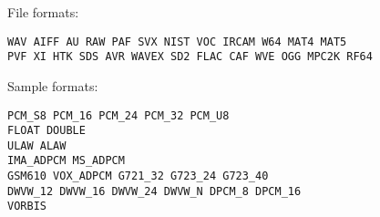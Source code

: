 File formats:
\begin{verbatim}
WAV AIFF AU RAW PAF SVX NIST VOC IRCAM W64 MAT4 MAT5
PVF XI HTK SDS AVR WAVEX SD2 FLAC CAF WVE OGG MPC2K RF64
\end{verbatim}

Sample formats:
\begin{verbatim}
PCM_S8 PCM_16 PCM_24 PCM_32 PCM_U8
FLOAT DOUBLE
ULAW ALAW
IMA_ADPCM MS_ADPCM
GSM610 VOX_ADPCM G721_32 G723_24 G723_40
DWVW_12 DWVW_16 DWVW_24 DWVW_N DPCM_8 DPCM_16
VORBIS
\end{verbatim}

